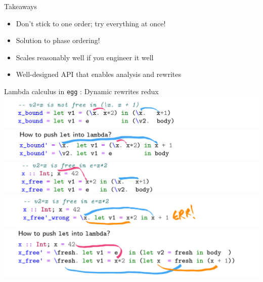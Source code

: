\documentclass[8pt]{beamer}
\newcommand{\egg}{\texttt{egg} }
\begin{document}
\begin{frame}[fragile]{Takeaways}
\begin{itemize}
\item Don't stick to one order; try everything at once!
\item Solution to phase ordering!
\item Scales reasonably well if you engineer it well
\item Well-designed API that enables analysis and rewrites
\end{itemize}
\end{frame}

\begin{frame}[fragile]{Lambda calculus in \egg: Dynamic rewrites redux}
\includegraphics[width=\textwidth]{./lc-1.png}
\pause
\includegraphics[width=\textwidth]{./lc-2.png}
\pause
\includegraphics[width=\textwidth]{./lc-3.png}
\pause
\includegraphics[width=\textwidth]{./lc-4.png}
\pause
\includegraphics[width=\textwidth]{./lc-5.png}
\end{frame}
\end{document}
